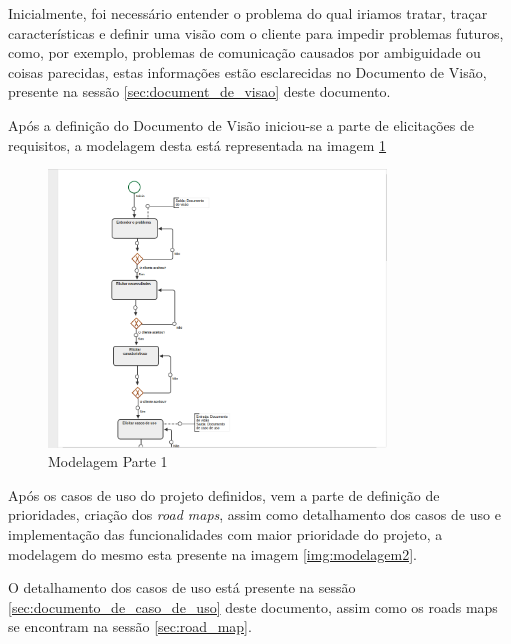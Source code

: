 
Inicialmente, foi necessário entender o problema do qual iriamos tratar, traçar características e definir uma visão com o cliente para impedir problemas futuros, como, por exemplo, problemas de comunicação causados por ambiguidade ou coisas parecidas, estas informações estão esclarecidas no Documento de Visão, presente na sessão \ref{sec:document_de_visao} deste documento.

Após a definição do Documento de Visão iniciou-se a parte de elicitações de requisitos, a modelagem desta está representada na imagem \ref{img:modelagem1}

\begin{figure}[!h]
	\centering
	\includegraphics[width=0.8\textwidth]{imgModelagem/modelagem1}
	\caption{Modelagem Parte 1}
	\label{img:modelagem1}
\end{figure}

Após os casos de uso do projeto definidos, vem a parte de definição de prioridades, criação dos \textit{road maps}, assim como detalhamento dos casos de uso e implementação das funcionalidades com maior prioridade do projeto, a modelagem do mesmo esta presente na imagem \ref{img:modelagem2}.

O detalhamento dos casos de uso está presente na sessão \ref{sec:documento_de_caso_de_uso} deste documento, assim como os roads maps se encontram na sessão \ref{sec:road_map}.

